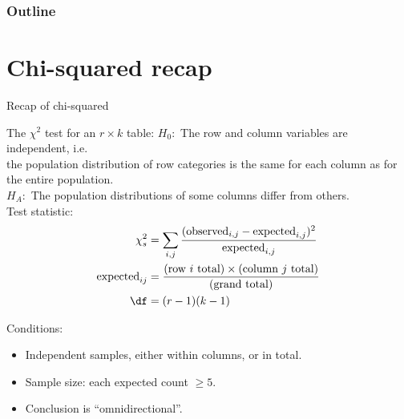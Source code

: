 %
%
%



\subtitle{or, ANOVA}

\date{14 April 2015}




\begin{frame}
  \maketitle
\end{frame}


\begin{frame}\frametitle<presentation>{Outline}
  \tableofcontents
\end{frame}

\section{Chi-squared recap}

\begin{frame}{Recap of chi-squared}
  \begin{block}{The $\chi^2$ test for an $r \times k$ table:}
    $H_0:$ The row and column variables are \alert{independent}, i.e.\\
      the population distribution of row categories is the same for each column 
      as for the entire population.\\
    $H_A:$ The population distributions of some columns differ from others. \\


    \alert{Test statistic:}
    \begin{align*}
      \chi^2_s &= \sum_{i,j} \frac{ (\text{observed}_{i,j} - \text{expected}_{i,j})^2 }{ \text{expected}_{i,j} }  \\
      \text{expected}_{ij} &= \frac{ \text{(row $i$ total)} \times \text{(column $j$ total)} }{ \text{(grand total)} } \\
      \df &= (r-1)(k-1)
    \end{align*}


    \alert{Conditions:} 
    \begin{itemize}
      \item Independent samples, either within columns, or in total.
      \item Sample size: each expected count ${}\ge 5$.
      \item Conclusion is ``omnidirectional''.
    \end{itemize}

  \end{block}
\end{frame}

